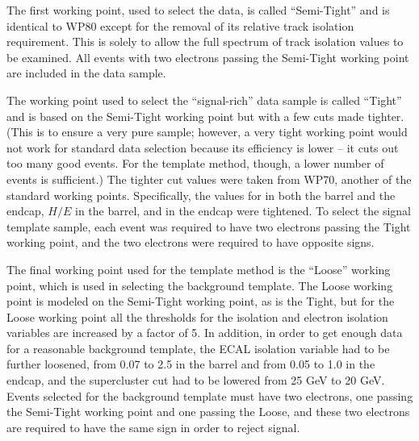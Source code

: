 The first working point, used to select the data, 
is called ``Semi-Tight'' and is identical to WP80 
except for the removal of its relative track isolation 
requirement.  
This is solely to allow the full spectrum of track 
isolation values to be examined.   
All events with two electrons passing the 
Semi-Tight working point are 
included in the data sample.  

The working point used to select the ``signal-rich'' 
data sample is called ``Tight'' 
and is based on the Semi-Tight working point 
but with a few cuts made tighter.  
(This is to ensure a very pure sample; 
however, a very tight working point would not work 
for standard data selection because its 
efficiency is lower -- 
it cuts out too many good events.  
For the template method, though, a lower number 
of events is sufficient.)  
The tighter cut values were taken from WP70, 
another of the standard working points. %
Specifically, 
the values for 
\dphiin in both the barrel and the endcap, 
$H/E$ in the barrel, 
and \detain in the endcap 
were tightened.  %
To select the signal template sample, 
each event was required to have two electrons 
passing the Tight working point, 
and the two electrons were required to have 
opposite signs.  

The final working point used for the template method 
is the ``Loose'' working point, 
which is used in selecting the background template.  
The Loose working point is modeled on the 
Semi-Tight working point, as is the Tight, 
but for the Loose working point 
all the thresholds for the isolation 
and electron isolation variables 
are increased by a factor of 5.  
In addition, in order to get enough data 
for a reasonable background template, 
the ECAL isolation variable had to be further loosened, 
from 0.07 to 2.5 in the barrel and from 0.05 to 1.0 in the endcap, 
and the supercluster \Et cut had to be lowered 
from 25 GeV to 20 GeV.  
Events selected for the background template 
must have two electrons, 
one passing the Semi-Tight working point 
and one passing the Loose, 
and these two electrons are required to 
have the same sign in order to reject signal.  




